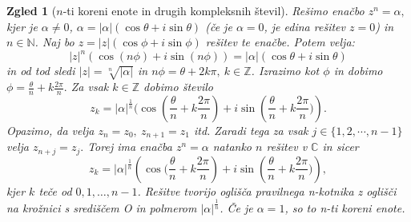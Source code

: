 \documentclass[10pt, a4paper]{article}
\newtheorem{zgled}{Zgled}[section]
\newcommand{\N}{\mathbb {N}}
\newcommand{\Z}{\mathbb {Z}}
\newcommand{\C}{\mathbb {C}}
\begin{document}
\begin{zgled}[$n$-ti koreni enote in drugih kompleksnih števil]
    Rešimo enačbo $z^n = \alpha,$ kjer je $\alpha \neq 0$, $\alpha = |\alpha|(\cos \theta + i\sin \theta)$ (če je $\alpha = 0$, je edina rešitev $z=0$) in $n \in \N$.
    Naj bo $z = |z|(\cos \phi + i \sin \phi)$ rešitev te enačbe. Potem velja:
    $$|z|^n(\cos (n\phi) + i \sin (n\phi)) = |\alpha|(\cos \theta + i\sin \theta)$$
    in od tod sledi $|z| = \sqrt[n]{|\alpha|}$ in $n\phi = \theta + 2 k\pi,\ k \in \Z$.
    Izrazimo kot $\phi$ in dobimo 
    $\phi = \frac{\theta}{n} + k\frac{2\pi}{n}.$ 
    Za vsak $k \in \Z$ dobimo število 
    $$z_k = |\alpha|^{\frac{1}{n}} (\cos\left(\frac{\theta}{n} + k\frac{2\pi}{n}\right) + i \sin\left(\frac{\theta}{n} + k\frac{2\pi}{n})\right).$$
    Opazimo, da velja $z_n = z_0,\ z_{n+1} = z_1$ itd. 
    Zaradi tega za vsak $ j \in \{1,2,\cdots,n-1\}$ velja $z_{n+j} = z_j.$
    Torej ima enačba $z^n = \alpha$ natanko $n$ rešitev v $\C$ in sicer 
    $$z_k = |\alpha|^{\frac{1}{n}} \left(\cos(\frac{\theta}{n} + k\frac{2\pi}{n}\right) + i \sin\left(\frac{\theta}{n} + k\frac{2\pi}{n})\right),$$ 
    kjer $k$ teče od $0,1,\dots,n-1$. Rešitve tvorijo oglišča pravilnega n-kotnika z oglišči na krožnici s središčem O in polmerom $|\alpha|^{\frac{1}{n}}$. Če je $\alpha = 1$, so to n-ti koreni enote.
\end{zgled}
\end{document}
